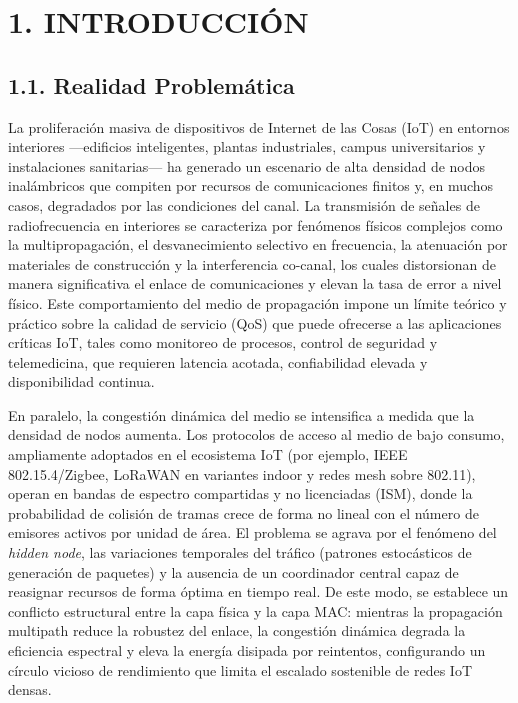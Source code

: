 \documentclass[
  12pt,
]{article}
\author{}
\date{}
\begin{document}
\section{1. INTRODUCCIÓN}\label{introducciuxf3n}

\subsection{1.1. Realidad Problemática}\label{realidad-problemuxe1tica}

La proliferación masiva de dispositivos de Internet de las Cosas (IoT)
en entornos interiores —edificios inteligentes, plantas industriales,
campus universitarios y instalaciones sanitarias— ha generado un
escenario de alta densidad de nodos inalámbricos que compiten por
recursos de comunicaciones finitos y, en muchos casos, degradados por
las condiciones del canal. La transmisión de señales de radiofrecuencia
en interiores se caracteriza por fenómenos físicos complejos como la
multipropagación, el desvanecimiento selectivo en frecuencia, la
atenuación por materiales de construcción y la interferencia co-canal,
los cuales distorsionan de manera significativa el enlace de
comunicaciones y elevan la tasa de error a nivel físico. Este
comportamiento del medio de propagación impone un límite teórico y
práctico sobre la calidad de servicio (QoS) que puede ofrecerse a las
aplicaciones críticas IoT, tales como monitoreo de procesos, control de
seguridad y telemedicina, que requieren latencia acotada, confiabilidad
elevada y disponibilidad continua.

En paralelo, la congestión dinámica del medio se intensifica a medida
que la densidad de nodos aumenta. Los protocolos de acceso al medio de
bajo consumo, ampliamente adoptados en el ecosistema IoT (por ejemplo,
IEEE 802.15.4/Zigbee, LoRaWAN en variantes indoor y redes mesh sobre
802.11), operan en bandas de espectro compartidas y no licenciadas
(ISM), donde la probabilidad de colisión de tramas crece de forma no
lineal con el número de emisores activos por unidad de área. El problema
se agrava por el fenómeno del \emph{hidden node}, las variaciones
temporales del tráfico (patrones estocásticos de generación de paquetes)
y la ausencia de un coordinador central capaz de reasignar recursos de
forma óptima en tiempo real. De este modo, se establece un conflicto
estructural entre la capa física y la capa MAC: mientras la propagación
multipath reduce la robustez del enlace, la congestión dinámica degrada
la eficiencia espectral y eleva la energía disipada por reintentos,
configurando un círculo vicioso de rendimiento que limita el escalado
sostenible de redes IoT densas.
\end{document}
